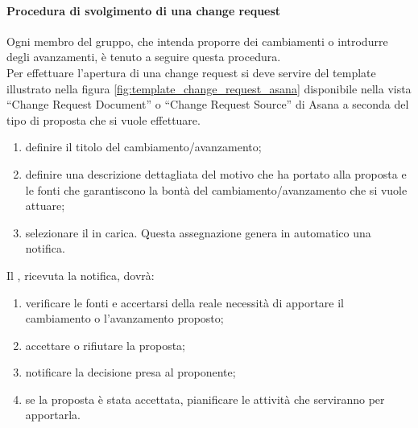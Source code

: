 			\paragraph{Procedura di svolgimento di una change request} %
			\label{par:procedura_di_svolgimento_di_una_change_request}
			Ogni membro del gruppo, che intenda proporre dei cambiamenti o introdurre degli avanzamenti, è tenuto a seguire questa procedura. \\
			Per effettuare l'apertura di una change request si deve servire del template illustrato nella figura \ref{fig:template_change_request_asana} disponibile nella vista ``Change Request Document'' o ``Change Request Source'' di Asana a seconda del tipo di proposta che si vuole effettuare.
				\begin{enumerate}
					\item definire il titolo del cambiamento/avanzamento;
					\item definire una descrizione dettagliata del motivo che ha portato alla proposta e le fonti che garantiscono la bontà del cambiamento/avanzamento che si vuole attuare;
					\item selezionare il \roleProjectManager{} in carica. Questa assegnazione genera in automatico una notifica.
				\end{enumerate}
			\noindent
			Il \roleProjectManager{}, ricevuta la notifica, dovrà:
			 	\begin{enumerate}
			 		\item verificare le fonti e accertarsi della reale necessità di apportare il cambiamento o l'avanzamento proposto;
			 		\item accettare o rifiutare la proposta;
					\item notificare la decisione presa al proponente\gloss{};
					\item se la proposta è stata accettata, pianificare le attività che serviranno per apportarla.
			 	\end{enumerate}
			

